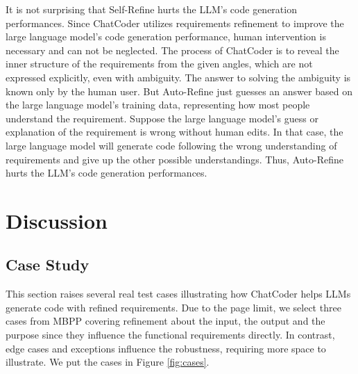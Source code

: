\documentclass[sigconf]{acmart}
\begin{document}
It is not surprising that Self-Refine hurts the LLM's code generation performances. Since ChatCoder utilizes requirements refinement to improve the large language model's code generation performance, human intervention is necessary and can not be neglected. The process of ChatCoder is to reveal the inner structure of the requirements from the given angles, which are not expressed explicitly, even with ambiguity. The answer to solving the ambiguity is known only by the human user. But Auto-Refine just guesses an answer based on the large language model's training data, representing how most people understand the requirement. Suppose the large language model's guess or explanation of the requirement is wrong without human edits. In that case, the large language model will generate code following the wrong understanding of requirements and give up the other possible understandings. Thus, Auto-Refine hurts the LLM's code generation performances.

\section{Discussion}
\subsection{Case Study}
This section raises several real test cases illustrating how ChatCoder helps LLMs generate code with refined requirements. Due to the page limit, we select three cases from MBPP covering refinement about the input, the output and the purpose since they influence the functional requirements directly. In contrast, edge cases and exceptions influence the robustness, requiring more space to illustrate. We put the cases in Figure \ref{fig:cases}.
\end{document}
